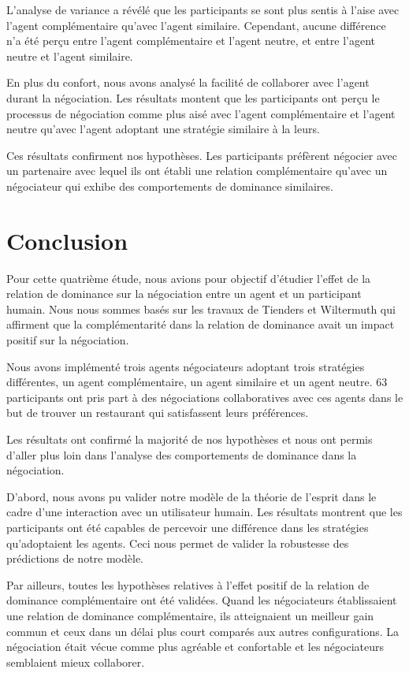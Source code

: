 	L'analyse de variance a révélé que les participants se sont plus sentis à l'aise avec l'agent complémentaire qu'avec l'agent similaire. Cependant, aucune différence n'a été perçu entre l'agent complémentaire et l'agent neutre, et entre l'agent neutre et l'agent similaire.
	
	En plus du confort, nous avons analysé la facilité de collaborer avec l'agent durant la négociation. Les résultats montent que les participants ont perçu le processus de négociation comme plus aisé avec l'agent complémentaire et l'agent neutre qu'avec l'agent adoptant une stratégie similaire à la leurs. 
	
	Ces résultats confirment nos hypothèses. Les participants préfèrent négocier avec un partenaire avec lequel ils ont établi une relation complémentaire qu'avec un négociateur qui exhibe des comportements de dominance similaires. 
	
	
	\section{Conclusion}
	Pour cette quatrième étude, nous avions pour objectif d'étudier l'effet de la relation de dominance sur la négociation entre un agent et un participant humain. Nous nous sommes basés sur les travaux de Tienders et Wiltermuth \cite{wiltermuth2009benefits,tiedens2003power} qui affirment que la complémentarité dans la relation de dominance avait un impact positif sur la négociation. 
	
	Nous avons implémenté trois agents négociateurs adoptant trois stratégies différentes, un agent complémentaire, un agent similaire et un agent neutre. 
	63 participants ont pris part à  des négociations collaboratives avec ces agents dans le but de trouver un restaurant qui satisfassent leurs préférences. 
	
	Les résultats ont confirmé la majorité de nos hypothèses et nous ont permis d'aller plus loin dans l'analyse des comportements de dominance dans la négociation. 
	
	D'abord, nous avons pu valider notre modèle de la théorie de l'esprit dans le cadre d'une interaction avec un utilisateur humain. 
	Les résultats montrent que les participants ont été capables de percevoir une différence dans les stratégies qu'adoptaient les agents. Ceci nous permet de valider la robustesse des prédictions de notre modèle. 
	
	Par ailleurs, toutes les hypothèses relatives à l'effet positif de la relation de dominance complémentaire ont été validées. Quand les négociateurs établissaient une relation de dominance complémentaire, ils atteignaient un meilleur gain commun et ceux dans un délai plus court comparés aux autres configurations. La négociation était vécue comme plus agréable et confortable et les négociateurs semblaient mieux collaborer. 
	

